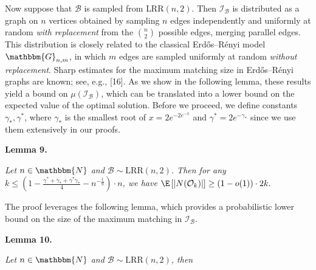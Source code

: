 Now suppose that $\mathcal{B}$ is sampled from $\text{{LRR}}(n,2)$. Then $\mathcal{I}_{\mathcal{B}}$ is distributed as a graph on $n$ vertices obtained by sampling $n$ edges independently and uniformly at random \emph{with replacement} from the $\binom{n}{2}$ possible edges, merging parallel edges. This distribution is closely related to the classical Erdős–Rényi model $\mathbbm{G}_{n,m}$, in which $m$ edges are sampled uniformly at random \emph{without replacement}. Sharp estimates for the maximum matching size in Erdős–Rényi graphs are known; see, e.g., [16].
As we show in the following lemma, these results yield a bound on $\mu(\mathcal{I}_{\mathcal{B}})$, which can be translated into a lower bound on the expected value of the optimal solution.
Before we proceed, we define constants $\gamma_{*},\gamma^{*}$, where $\gamma_{*}$ is the smallest root of $x=2e^{-2e^{-x}}$ and $\gamma^{*}=2e^{-\gamma_{*}}$ since we use them extensively in our proofs.\par





\par\medskip\noindent\textbf{\textbf{Lemma 9}\textbf{.}}\par



\emph{Let $n\in\mathbbm{N}$ and $\mathcal{B}\sim\text{{LRR}}\left(n,2\right)$.
Then for any $k\leq\left(1-\frac{\gamma^{*}+\gamma_{*}+\gamma^{*}\gamma_{*}}{4}-n^{-\frac{1}{9}}\right)\cdot n$, we have $\E\left[|N(\mathcal{O}_{k})|\right]\geq(1-o(1))\cdot 2k.$}\par






The proof leverages the following lemma, which provides a probabilistic lower bound on the size of the maximum matching in $\mathcal{I}_{\mathcal{B}}$.\par





\par\medskip\noindent\textbf{\textbf{Lemma 10}\textbf{.}}\par



\emph{Let $n\in\mathbbm{N}$ and $\mathcal{B}\sim\text{{LRR}}\left(n,2\right)$, then}\par


